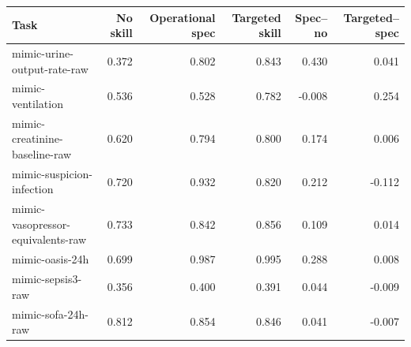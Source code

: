 \begin{tabular}{lrrrrr}
\toprule
Task & No skill & Operational spec & Targeted skill & Spec--no & Targeted--spec \\
\midrule
mimic-urine-output-rate-raw & 0.372 & 0.802 & 0.843 & 0.430 & 0.041 \\
mimic-ventilation & 0.536 & 0.528 & 0.782 & -0.008 & 0.254 \\
mimic-creatinine-baseline-raw & 0.620 & 0.794 & 0.800 & 0.174 & 0.006 \\
mimic-suspicion-infection & 0.720 & 0.932 & 0.820 & 0.212 & -0.112 \\
mimic-vasopressor-equivalents-raw & 0.733 & 0.842 & 0.856 & 0.109 & 0.014 \\
mimic-oasis-24h & 0.699 & 0.987 & 0.995 & 0.288 & 0.008 \\
mimic-sepsis3-raw & 0.356 & 0.400 & 0.391 & 0.044 & -0.009 \\
mimic-sofa-24h-raw & 0.812 & 0.854 & 0.846 & 0.041 & -0.007 \\
\bottomrule
\end{tabular}

